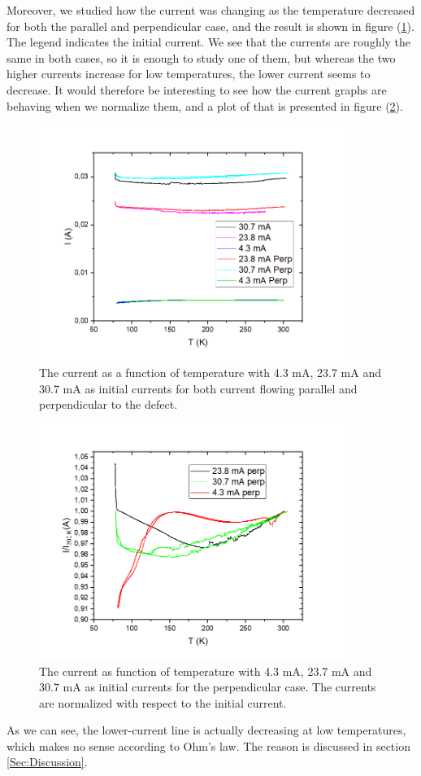 \documentclass{comjnl}
\begin{document}
Moreover, we studied how the current was changing as the temperature decreased for both the parallel and perpendicular case, and the result is shown in figure (\ref{fig:cur}). The legend indicates the initial current. We see that the currents are roughly the same in both cases, so it is enough to study one of them, but whereas the two higher currents increase for low temperatures, the lower current seems to decrease. It would therefore be interesting to see how the current graphs are behaving when we normalize them, and a plot of that is presented in figure (\ref{fig:cur_norm}). 
\begin{figure}[!h]
\centering
\includegraphics[width=100mm]{Bilde3.png}
\caption{The current as a function of temperature with 4.3 mA, 23.7 mA and 30.7 mA as initial currents for both current flowing parallel and perpendicular to the defect.\label{fig:cur}}
\end{figure}
\begin{figure}[!h]
\centering
\includegraphics[width=100mm]{Bilde4.png}
\caption{The current as function of temperature with 4.3 mA, 23.7 mA and 30.7 mA as initial currents for the perpendicular case. The currents are normalized with respect to the initial current.\label{fig:cur_norm}}
\end{figure}
As we can see, the lower-current line is actually decreasing at low temperatures, which makes no sense according to Ohm's law. The reason is discussed in section \ref{Sec:Discussion}.
\end{document}
